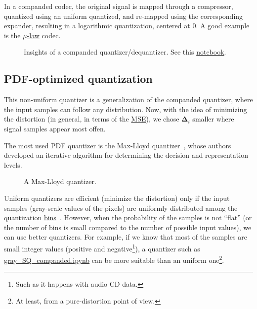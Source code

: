 In a companded codec, the original signal is mapped through a
compressor, quantized using an uniform quantized, and re-mapped using
the corresponding expander, resulting in a logarithmic quantization,
centered at $0$. A good example is the
\href{https://en.wikipedia.org/wiki/\%CE\%9C-law_algorithm}{\(\mu\)-law}
codec.

\begin{figure}
  \centering
  \caption{Insights of a companded quantizer/dequantizer. See this
    \href{https://github.com/vicente-gonzalez-ruiz/scalar_quantization/blob/master/docs/graphics/companded_quantization.ipynb}{notebook}.}
  \label{fig:companded_quantizer}
\end{figure}


\subsection{PDF-optimized quantization}

This non-uniform quantizer is a generalization of the companded
quantizer, where the input samples can follow any distribution. Now,
with the idea of minimizing the distortion (in general, in terms of
the \href{https://en.wikipedia.org/wiki/Mean_squared_error}{MSE}), we
chose ${\mathbf\Delta}_i$ smaller where signal samples appear most
offen.

The most used PDF quantizer is the Max-Lloyd
quantizer~\cite{lloyd1982least}, whose authors developed an iterative
algorithm for determining the decision and representation levels.

\begin{figure}
  \centering
  \caption{A Max-Lloyd quantizer.}
  \label{fig:Max-Lloyd}
\end{figure}

Uniform quantizers are efficient (minimize the distortion) only if the
input samples (gray-scale values of the pixels) are uniformly
distributed among the quantization
\href{https://en.wikipedia.org/wiki/Data_binning}{bins}~\cite{vruiz__scalar_quantization}. However,
when the probability of the samples is not ``flat'' (or the number of
bins is small compared to the number of possible input values), we can
use better quantizers. For example, if we know that most of the
samples are small integer values (positive and negative\footnote{Such
as it happens with audio CD data.}), a quantizer such as
\href{https://github.com/vicente-gonzalez-ruiz/scalar_quantization/blob/master/docs/gray_SQ_companded.ipynb}{gray\_SQ\_companded.ipynb}
can be more suitable than an uniform one\footnote{At least, from a
  pure-distortion point of view.}.

